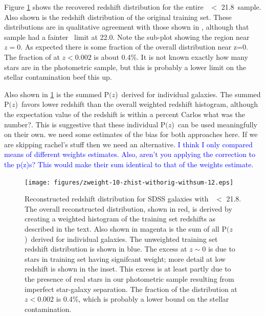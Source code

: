 \documentclass{emulateapj}
\newcommand{\rmax}{21.8}
\newcommand{\pofz}{P$(z$)}
\begin{document}
Figure \ref{fig:pofz} shows the recovered redshift distribution for the entire
\rmag\ $<$ \rmax\ sample.  Also shown is the redshift distribution of the
original training set.  These distributions are in qualitative agreement with
those shown in \citet{CunhaPhotoz09}, although that sample had a fainter \rmag\
limit at 22.0.  Note the sub-plot showing the region near $z=0$.  As expected
there is some fraction of the overall distribution near z=0.  The fraction of
at $z < 0.002$ is about 0.4\%.  It is not known exactly how many stars are in
the photometric sample, but this is probably a lower limit on the stellar
contamination {\color{red}beef this up}.

Also shown in \ref{fig:pofz} is the summed \pofz\ derived for individual
galaxies.  The summed \pofz\ favors lower redshift than the overall weighted
redshift histogram, although the expectation value of the redshift is within a
percent {\color{red} Carlos what was the number?}.  This is suggestive that
these individual \pofz\ can be used meaningfully on their own. {\color{red} 
we need some estimates of the bias for both approaches here.  If we are
skipping rachel's stuff then we need an alternative.}
\textcolor{blue}{I think I only compared means of different weights estimates. 
Also, aren't you applying the correction to the p(z)s? This would make their sum
identical to that of the weights estimate.}

\begin{figure}[t] \centering
    \texttt{[image: figures/zweight-10-zhist-withorig-withsum-12.eps]}

    \caption{Reconstructed redshift distribution for SDSS galaxies with \rmag\
    $ < $ \rmax.  The overall reconstructed distribution, shown in red, is
    derived by creating a weighted histogram of the training set redshifts as
    described in the text.  Also shown in magenta is the sum of all \pofz\
    derived for individual galaxies.  The unweighted training set redshift
    distribution is shown in blue.  The excess at $z \sim 0$ is due to stars in
    training set having signifcant weight; more detail at low redshift is shown
    in the inset.  This excess is at least partly due to the presence of real
    stars in our photometric sample resulting from imperfect star-galaxy
    separation.  The fraction of the distribution at $z < 0.002$ is 0.4\%,
    which is probably a lower bound on the stellar contamination.
    \label{fig:pofz}}

    \vspace{2em}
\end{figure}
\end{document}
